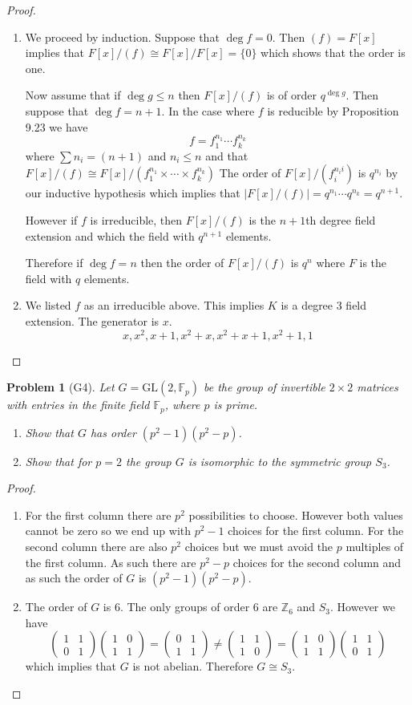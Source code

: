\documentclass[10pt]{article}
\newcommand{\sk}{\vskip 10mm}
\newcommand{\bb}[1]{\mathbb{#1}}
\newcommand{\mm}[4]{\left(\begin{array}{cc}  #1 &  #2 \\ #3 & #4\end{array}\right)}
\theoremstyle{plain}
\newtheorem{problem}{Problem}
\theoremstyle{remark}
\begin{document}
\begin{proof}
  \begin{enumerate}
  \item We proceed by induction. Suppose that $\deg f=0$. Then $(f)=F[x]$
    implies that $F[x]/(f)\cong F[x]/F[x]=\{0\}$ which shows that the order is one.

    Now assume that if $\deg g \leq n$ then $F[x]/(f)$ is of order $q^{\deg g}$.
    Then suppose that $\deg f = n+1$. In the case where $f$ is reducible
    by Proposition 9.23 we have
    \[ f=f_1^{n_1}\cdots f_k^{n_k} \]
    where $\sum n_i=(n+1)$ and $n_i\leq n$ and that
    $F[x]/(f) \cong F[x]/(f_1^{n_1}\times\cdots\times f_k^{n_k})$
    The order of $F[x]/(f_i^{n_ii})$ is $q^{n_i}$ by our inductive hypothesis
    which implies that $|F[x]/(f)|=q^{n_1}\cdots q^{n_k}=q^{n+1}$.

    However if $f$ is irreducible, then $F[x]/(f)$ is the $n+1$th degree
    field extension and which the field with $q^{n+1}$ elements.

    Therefore if $\deg f=n$ then the order of $F[x]/(f)$ is $q^n$ where
    $F$ is the field with $q$ elements.
  \item We listed $f$ as an irreducible above. This implies $K$ is a
    degree 3 field extension. The generator is $x$.
    \[ x,x^2,x+1,x^2+x,x^2+x+1,x^2+1,1\]
  \end{enumerate}
\end{proof}

\sk


\begin{problem}[G4]
  Let $G=\text{GL}(2,\bb{F}_p)$ be the group of invertible $2\times 2$ matrices
  with entries in the finite field $\bb{F}_p$, where $p$ is prime.
  \begin{enumerate}
  \item Show that $G$ has order $(p^2-1)(p^2-p)$.
  \item Show that for $p=2$ the group $G$ is isomorphic to the symmetric group
    $S_3$.
  \end{enumerate}
\end{problem}

\begin{proof}
  \begin{enumerate}
  \item For the first column there are $p^2$  possibilities to choose. However
    both values cannot be zero so we end up with $p^2-1$ choices for
    the first column. For the second column there are also $p^2$ choices
    but we must avoid the $p$ multiples of the first column.  As such
    there are $p^2-p$ choices for the second column and as such
    the order of $G$ is $(p^2-1)(p^2-p)$.
  \item The order of $G$ is 6. The only groups of order 6 are
    $\bb{Z}_6$ and $S_3$. However  we have
    \[ \mm{1}{1}{0}{1}\mm{1}{0}{1}{1}=\mm{0}{1}{1}{1}\neq \mm{1}{1}{1}{0}=\mm{1}{0}{1}{1} \mm{1}{1}{0}{1} \]
    which implies that $G$ is not abelian. Therefore $G\cong S_3$.
  \end{enumerate}
\end{proof}
\end{document}
